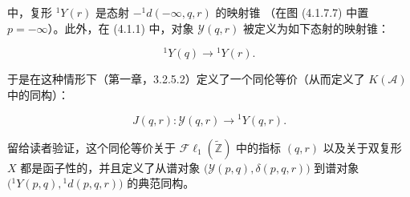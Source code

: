 中，复形 ${}^{1}\!Y(r)$ 是态射 $-{}^{1}\!d(-\infty,q,r)$ 的映射锥
（在图 (4.1.7.7) 中置 $p=-\infty$）。此外，在 (4.1.1) 中，对象
$\mathcal Y(q,r)$ 被定义为如下态射的映射锥：

\begin{equation}
{}^{1}\!Y(q)\longrightarrow{}^{1}\!Y(r).
\tag{4.1.7.9}
\end{equation}

于是在这种情形下（第一章，3.2.5.2）定义了一个同伦等价（从而定义了
$K(\mathcal A)$ 中的同构）：

\begin{equation}
J(q,r)\colon\mathcal Y(q,r)\longrightarrow{}^{1}\!Y(q,r).
\tag{4.1.7.10}
\end{equation}

留给读者验证，这个同伦等价关于
$\mathcal{F}\ell_1(\widetilde{\mathbb Z})$ 中的指标 $(q,r)$ 以及关于双复形
$X$ 都是函子性的，并且定义了从谱对象
$\bigl(\mathcal Y(p,q),\delta(p,q,r)\bigr)$ 到谱对象
$\bigl({}^{1}\!Y(p,q),{}^{1}\!d(p,q,r)\bigr)$ 的典范同构。
\endgroup
